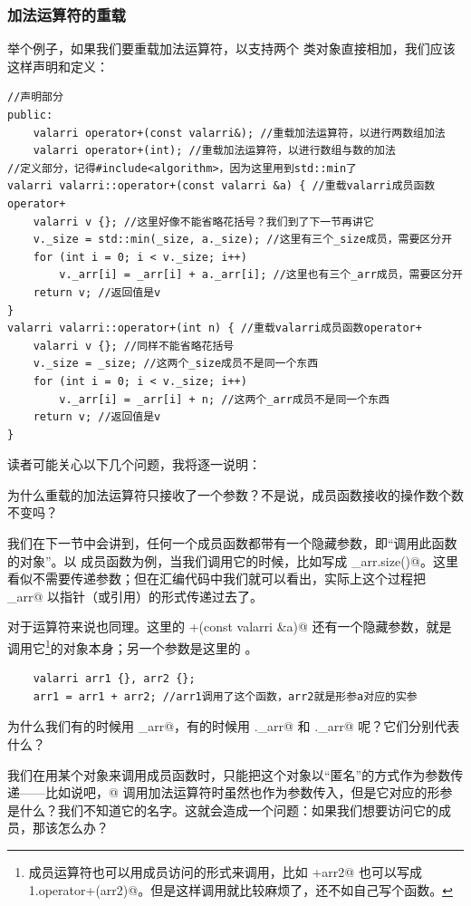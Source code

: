 \subsubsection*{加法运算符的重载}
举个例子，如果我们要重载加法运算符，以支持两个 \lstinline@valarri@ 类对象直接相加，我们应该这样声明和定义：
\begin{lstlisting}
//声明部分
public:
    valarri operator+(const valarri&); //重载加法运算符，以进行两数组加法
    valarri operator+(int); //重载加法运算符，以进行数组与数的加法
//定义部分，记得#include<algorithm>，因为这里用到std::min了
valarri valarri::operator+(const valarri &a) { //重载valarri成员函数operator+
    valarri v {}; //这里好像不能省略花括号？我们到了下一节再讲它
    v._size = std::min(_size, a._size); //这里有三个_size成员，需要区分开
    for (int i = 0; i < v._size; i++)
        v._arr[i] = _arr[i] + a._arr[i]; //这里也有三个_arr成员，需要区分开
    return v; //返回值是v
}
valarri valarri::operator+(int n) { //重载valarri成员函数operator+
    valarri v {}; //同样不能省略花括号
    v._size = _size; //这两个_size成员不是同一个东西
    for (int i = 0; i < v._size; i++)
        v._arr[i] = _arr[i] + n; //这两个_arr成员不是同一个东西
    return v; //返回值是v
}
\end{lstlisting}
读者可能关心以下几个问题，我将逐一说明：\par
{\kaishu 为什么重载的加法运算符只接收了一个参数？不是说，成员函数接收的操作数个数不变吗？}\par
我们在下一节中会讲到，任何一个成员函数都带有一个隐藏参数，即``调用此函数的对象''。以 \lstinline@size@ 成员函数为例，当我们调用它的时候，比如写成 \lstinline@_arr.size()@。这里看似不需要传递参数；但在汇编代码中我们就可以看出，实际上这个过程把 \lstinline@_arr@ 以指针（或引用）的形式传递过去了。\par
对于运算符来说也同理。这里的 \lstinline@valarri+(const valarri &a)@ 还有一个隐藏参数，就是调用它\footnote{成员运算符也可以用成员访问的形式来调用，比如 +arr2@ 也可以写成 \lstinline@arr1.operator+(arr2)@。但是这样调用就比较麻烦了，还不如自己写个函数。}的对象本身；另一个参数是这里的 \lstinline@a@。
\begin{lstlisting}
    valarri arr1 {}, arr2 {};
    arr1 = arr1 + arr2; //arr1调用了这个函数，arr2就是形参a对应的实参
\end{lstlisting}\par
{\kaishu 为什么我们有的时候用 \lstinline@_arr@，有的时候用 \lstinline@v._arr@ 和 \lstinline@a._arr@ 呢？它们分别代表什么？}\par
我们在用某个对象来调用成员函数时，只能把这个对象以``匿名''的方式作为参数传递——比如说吧，@ 调用加法运算符时虽然也作为参数传入，但是它对应的形参是什么？我们不知道它的名字。这就会造成一个问题：如果我们想要访问它的成员，那该怎么办？\par
